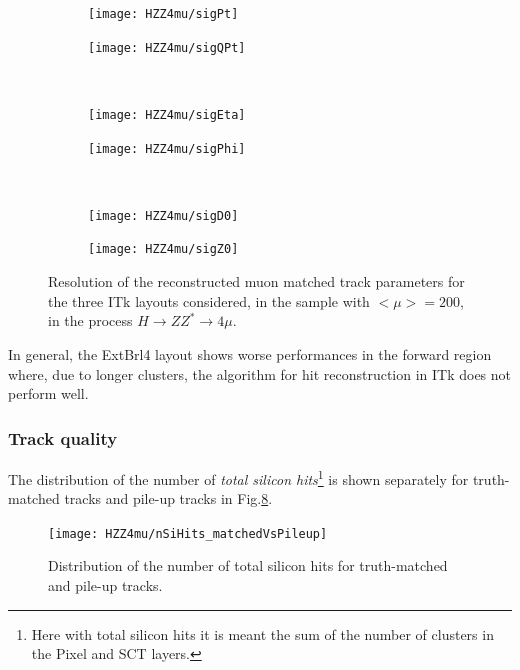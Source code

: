 \documentclass[a4paper,twoside,12pt]{article}
\begin{document}
\begin{figure}
\begin{subfigure}{.5\linewidth}
\texttt{[image: HZZ4mu/sigPt]}
\caption{}
\label{fig:HZZ4mu:sigPt}
\end{subfigure}
\begin{subfigure}{.5\linewidth}
\texttt{[image: HZZ4mu/sigQPt]}
\caption{}
\label{fig:HZZ4mu:sigQPt}
\end{subfigure}\\[1ex]
\begin{subfigure}{.5\linewidth}
\texttt{[image: HZZ4mu/sigEta]}
\caption{}
\label{fig:HZZ4mu:sigEta}
\end{subfigure}
\begin{subfigure}{.5\linewidth}
\texttt{[image: HZZ4mu/sigPhi]}
\caption{}
\label{fig:HZZ4mu:sigPhi}
\end{subfigure}\\[1ex]
\begin{subfigure}{.5\linewidth}
\texttt{[image: HZZ4mu/sigD0]}
\caption{}
\label{fig:HZZ4mu:sigD0}
\end{subfigure}
\begin{subfigure}{.5\linewidth}
\texttt{[image: HZZ4mu/sigZ0]}
\caption{}
\label{fig:HZZ4mu:sigZ0}
\end{subfigure}
\caption{Resolution of the reconstructed muon matched track parameters for the three ITk layouts considered, in the sample with $<\mu> = 200$, in the process $H \rightarrow ZZ^* \rightarrow 4\mu$.}
\label{fig:HZZ4mu:muonResolution}
\end{figure}

In general, the ExtBrl4 layout shows worse performances in the forward region where, due to longer clusters, the algorithm for hit reconstruction in ITk
does not perform well.\\

\subsubsection*{Track quality}
The distribution of the number of \textit{total silicon hits}\footnote{Here with total silicon hits it is meant the sum of the number
of clusters in the Pixel and SCT layers.} is shown separately for truth-matched tracks and pile-up tracks in
Fig.\ref{fig:HZZ4mu:trackQuality}.

\begin{figure}
\centering
\texttt{[image: HZZ4mu/nSiHits\_matchedVsPileup]}
\caption{Distribution of the number of total silicon hits for truth-matched and pile-up tracks.}
\label{fig:HZZ4mu:trackQuality}
\end{figure}
\end{document}
